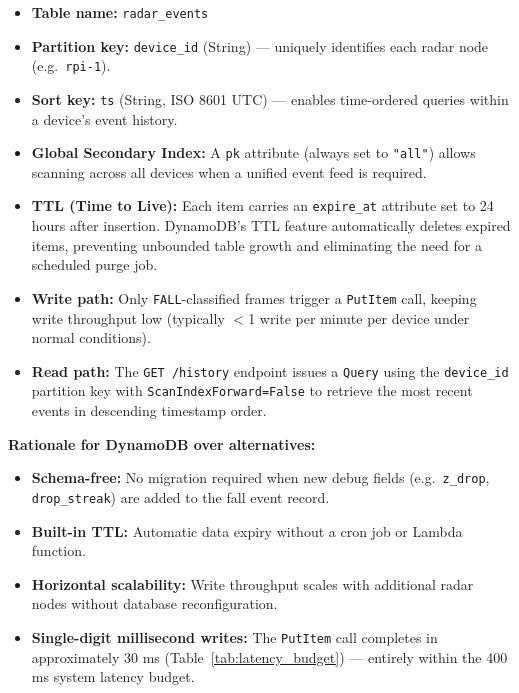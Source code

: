\begin{itemize}
    \item \textbf{Table name:} \texttt{radar\_events}
    \item \textbf{Partition key:} \texttt{device\_id} (String) --- uniquely identifies each radar node (e.g.\ \texttt{rpi-1}).
    \item \textbf{Sort key:} \texttt{ts} (String, ISO 8601 UTC) --- enables time-ordered queries within a device's event history.
    \item \textbf{Global Secondary Index:} A \texttt{pk} attribute (always set to \texttt{"all"}) allows scanning across all devices when a unified event feed is required.
    \item \textbf{TTL (Time to Live):} Each item carries an \texttt{expire\_at} attribute set to 24 hours after insertion. DynamoDB's TTL feature automatically deletes expired items, preventing unbounded table growth and eliminating the need for a scheduled purge job.
    \item \textbf{Write path:} Only \texttt{FALL}-classified frames trigger a \texttt{PutItem} call, keeping write throughput low (typically $<$1 write per minute per device under normal conditions).
    \item \textbf{Read path:} The \texttt{GET /history} endpoint issues a \texttt{Query} using the \texttt{device\_id} partition key with \texttt{ScanIndexForward=False} to retrieve the most recent events in descending timestamp order.
\end{itemize}

\textbf{Rationale for DynamoDB over alternatives:}

\begin{itemize}
    \item \textbf{Schema-free:} No migration required when new debug fields (e.g.\ \texttt{z\_drop}, \texttt{drop\_streak}) are added to the fall event record.
    \item \textbf{Built-in TTL:} Automatic data expiry without a cron job or Lambda function.
    \item \textbf{Horizontal scalability:} Write throughput scales with additional radar nodes without database reconfiguration.
    \item \textbf{Single-digit millisecond writes:} The \texttt{PutItem} call completes in approximately 30 ms (Table~\ref{tab:latency_budget}) --- entirely within the 400 ms system latency budget.
\end{itemize}

